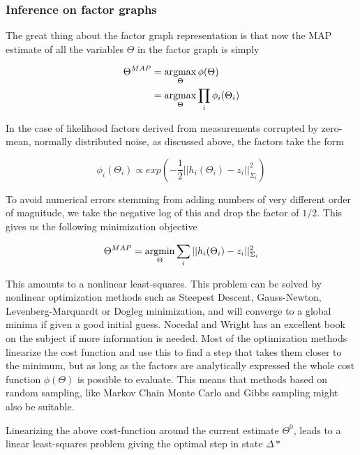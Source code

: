 \subsubsection{Inference on factor graphs}

The great thing about the factor graph representation is that now the MAP estimate of all the variables $\Theta$ in the factor graph is simply

\begin{align}
    \Theta^{MAP} &= \operatorname*{argmax}_{\Theta} \phi(\Theta) \\
    &= \operatorname*{argmax}_{\Theta}\prod_i \phi_i(\Theta_i)
\end{align}

In the case of likelihood factors derived from measurements corrupted by zero-mean, normally distributed noise, as discussed above, the factors take the form

\begin{equation}
    \phi_i(\Theta_i) \propto exp(-\frac{1}{2}||h_i(\Theta_i) - z_i||_{\Sigma_i}^2)
\end{equation}

To avoid numerical errors stemming from adding numbers of very different order of magnitude, we take the negative log of this and drop the factor of $1/2$. This gives us the following minimization objective

\begin{equation}
    \Theta^{MAP} = \operatorname*{argmin}_{\Theta}\sum_i ||h_i(\Theta_i) - z_i||_{\Sigma_i}^2
\end{equation}

This amounts to a nonlinear least-squares. This problem can be solved by nonlinear optimization methods such as Steepest Descent, Gauss-Newton, Levenberg-Marquardt or Dogleg minimization, and will converge to a global minima if given a good initial guess. Nocedal and Wright\cite{NumOpt} has an excellent book on the subject if more information is needed. Most of the optimization methods linearize the cost function and use this to find a step that takes them closer to the minimum, but as long as the factors are analytically expressed the whole cost function $\phi(\Theta)$ is possible to evaluate. This means that methods based on random sampling, like Markov Chain Monte Carlo and Gibbs sampling\cite{SamplingOpt} might also be suitable. 

Linearizing the above cost-function around the current estimate $\Theta^0$, leads to a linear least-squares problem giving the optimal step in state $\Delta*$

